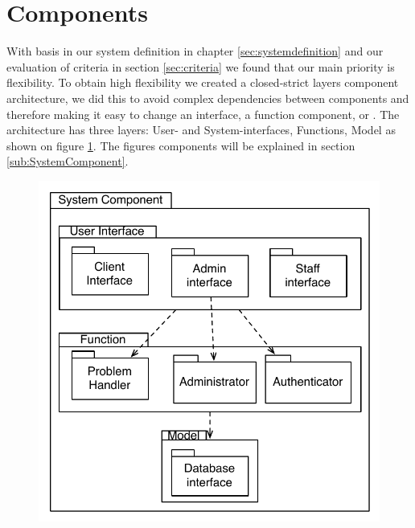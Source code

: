\section{Components}
\label{sec:components}
With basis in our system definition in chapter \ref{sec:systemdefinition} and our evaluation of criteria in section \ref{sec:criteria} we found that our main priority is flexibility. To obtain high flexibility we created a closed-strict layers component architecture, we did this to avoid complex dependencies between components and therefore making it easy to change an interface, a function component, or . 
The architecture has three layers: User- and System-interfaces, Functions, Model as shown on figure \ref{fig:SystemComponent}. The figures components will be explained in section \ref{sub:SystemComponent}.

\begin{figure}
	\centering
		\includegraphics[scale=0.5]{input/architectural_design/system_component_denvibruger.pdf}
	\label{fig:SystemComponent}
\end{figure}


